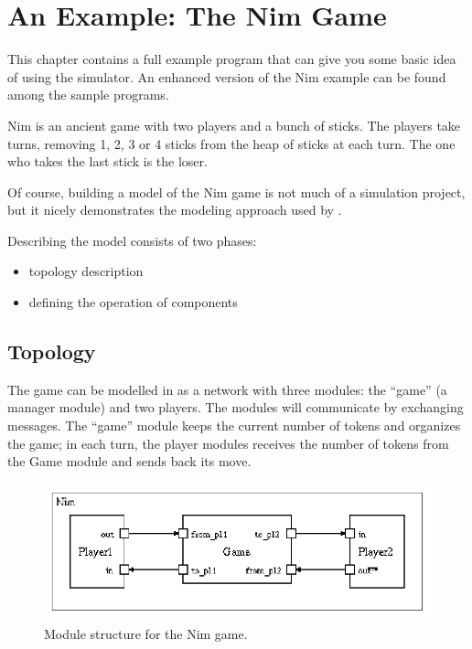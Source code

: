 \chapter{An Example: The Nim Game}
\label{cha:the-nim-game}


This chapter contains a full example program that can give you
some basic idea of using the simulator. An enhanced version of
the Nim example can be found among the sample programs.

Nim is an ancient game with two players and a bunch of sticks.
The players take turns, removing 1, 2, 3 or 4 sticks from the
heap of sticks at each turn. The one who takes the last stick
is the loser.


Of course, building a model of the Nim game is not much of a
simulation project, but it nicely demonstrates the modeling approach
used by {\opp}.


Describing the model consists of two phases:
\begin{itemize}
\item{topology description}
\item{defining the operation of components}
\end{itemize}



\section{Topology}

The game can be modelled in {\opp} as a network with three modules:
the ``game'' (a manager module) and two players.
The modules will communicate by exchanging messages. The ``game''
module keeps the current number of tokens and organizes the game;
in each turn, the player modules receives the number of tokens
from the Game module and sends back its move.

\begin{figure}[htbp]
\begin{center}
\includegraphics[width=4.483in, height=1.568in]{figures/usmanFig6}
\caption{Module structure for the Nim game.}
\end{center}
\end{figure}

